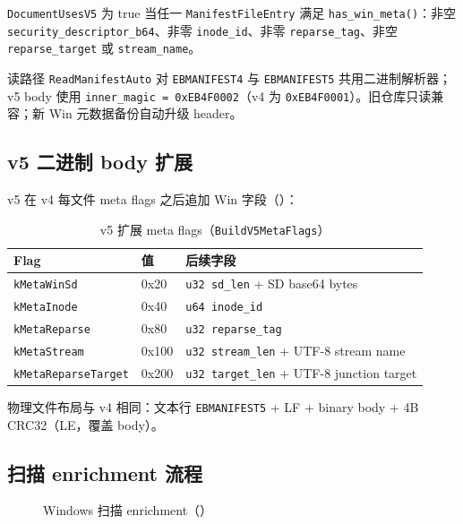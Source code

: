 \texttt{DocumentUsesV5} 为 true 当任一 \texttt{ManifestFileEntry} 满足 \texttt{has\_win\_meta()}：非空 \texttt{security\_descriptor\_b64}、非零 \texttt{inode\_id}、非零 \texttt{reparse\_tag}、非空 \texttt{reparse\_target} 或 \texttt{stream\_name}。

\begin{designbox}[v4/v5 兼容策略]
读路径 \texttt{ReadManifestAuto} 对 \texttt{EBMANIFEST4} 与 \texttt{EBMANIFEST5} 共用二进制解析器；v5 body 使用 \texttt{inner\_magic = 0xEB4F0002}（v4 为 \texttt{0xEB4F0001}）。旧仓库只读兼容；新 Win 元数据备份自动升级 header。
\end{designbox}

\subsection{v5 二进制 body 扩展}

v5 在 v4 每文件 meta flags 之后追加 Win 字段（）：

\begin{longtable}{@{}llp{7.5cm}@{}}
\caption{v5 扩展 meta flags（\texttt{BuildV5MetaFlags}）} \\
\toprule
Flag & 值 & 后续字段 \\
\midrule
\texttt{kMetaWinSd} & 0x20 & \texttt{u32 sd\_len} + SD base64 bytes \\
\texttt{kMetaInode} & 0x40 & \texttt{u64 inode\_id} \\
\texttt{kMetaReparse} & 0x80 & \texttt{u32 reparse\_tag} \\
\texttt{kMetaStream} & 0x100 & \texttt{u32 stream\_len} + UTF-8 stream name \\
\texttt{kMetaReparseTarget} & 0x200 & \texttt{u32 target\_len} + UTF-8 junction target \\
\bottomrule
\end{longtable}

物理文件布局与 v4 相同：文本行 \texttt{EBMANIFEST5} + LF + binary body + 4B CRC32（LE，覆盖 body）。

\subsection{扫描 enrichment 流程}

\begin{figure}[htbp]
\centering
{}
\caption{Windows 扫描 enrichment（）}
\label{fig:win-scan-enrich}
\end{figure}

